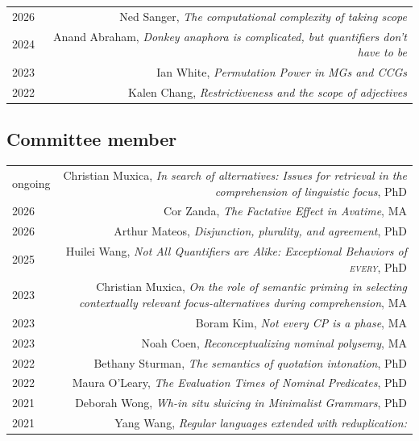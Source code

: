 \documentclass[12pt]{article}
\begin{document}
\begin{longtable}{LR}
  2026    & Ned Sanger, \textit{The computational complexity of taking scope}
  \\
  2024    & Anand Abraham, \textit{Donkey anaphora is complicated, but
            quantifiers don't have to be}
  \\
  2023    & Ian White, \textit{Permutation Power in MGs and CCGs}
  \\
  2022    & Kalen Chang, \textit{Restrictiveness and the scope of adjectives}
\end{longtable}

\subsection*{Committee member}

\begin{longtable}{LR}
  ongoing & Christian Muxica, \textit{In search of alternatives: Issues for
            retrieval in the comprehension of linguistic focus}, PhD\\
  2026    & Cor Zanda, \textit{The Factative Effect in Avatime}, MA\\
  2026    & Arthur Mateos, \textit{Disjunction, plurality, and agreement}, PhD\\
  2025    & Huilei Wang, \textit{Not All Quantifiers are Alike: Exceptional
            Behaviors of \textsc{every}}, PhD\\
  2023    & Christian Muxica, \textit{On the role of semantic priming in
            selecting contextually relevant focus-alternatives during
            comprehension}, MA\\
  2023    & Boram Kim, \textit{Not every CP is a phase}, MA\\
  2023    & Noah Coen, \textit{Reconceptualizing nominal polysemy}, MA\\
  2022    & Bethany Sturman, \textit{The semantics of quotation intonation},
            PhD\\
  2022    & Maura O'Leary, \textit{The Evaluation Times of Nominal Predicates},
            PhD\\
  2021    & Deborah Wong, \textit{Wh-in situ sluicing in Minimalist Grammars},
            PhD\\
  2021    & Yang Wang, \textit{Regular languages extended with reduplication:
}
\end{longtable}
\end{document}
